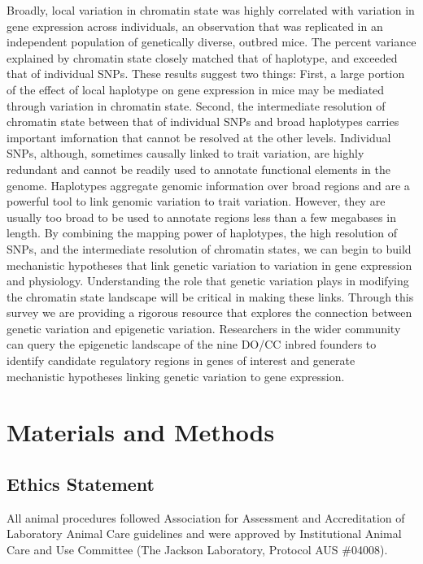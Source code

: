\documentclass[
  11pt,
]{article}
\begin{document}
Broadly, local variation in chromatin state was highly correlated with
variation in gene expression across individuals, an observation that was
replicated in an independent population of genetically diverse, outbred
mice. The percent variance explained by chromatin state closely matched
that of haplotype, and exceeded that of individual SNPs. These results
suggest two things: First, a large portion of the effect of local
haplotype on gene expression in mice may be mediated through variation
in chromatin state. Second, the intermediate resolution of chromatin
state between that of individual SNPs and broad haplotypes carries
important imfornation that cannot be resolved at the other levels.
Individual SNPs, although, sometimes causally linked to trait variation,
are highly redundant and cannot be readily used to annotate functional
elements in the genome. Haplotypes aggregate genomic information over
broad regions and are a powerful tool to link genomic variation to trait
variation. However, they are usually too broad to be used to annotate
regions less than a few megabases in length. By combining the mapping
power of haplotypes, the high resolution of SNPs, and the intermediate
resolution of chromatin states, we can begin to build mechanistic
hypotheses that link genetic variation to variation in gene expression
and physiology. Understanding the role that genetic variation plays in
modifying the chromatin state landscape will be critical in making these
links. Through this survey we are providing a rigorous resource that
explores the connection between genetic variation and epigenetic
variation. Researchers in the wider community can query the epigenetic
landscape of the nine DO/CC inbred founders to identify candidate
regulatory regions in genes of interest and generate mechanistic
hypotheses linking genetic variation to gene expression.

\hypertarget{materials-and-methods}{%
\section{Materials and Methods}\label{materials-and-methods}}

\hypertarget{ethics-statement}{%
\subsection{Ethics Statement}\label{ethics-statement}}

All animal procedures followed Association for Assessment and
Accreditation of Laboratory Animal Care guidelines and were approved by
Institutional Animal Care and Use Committee (The Jackson Laboratory,
Protocol AUS \#04008).
\end{document}
